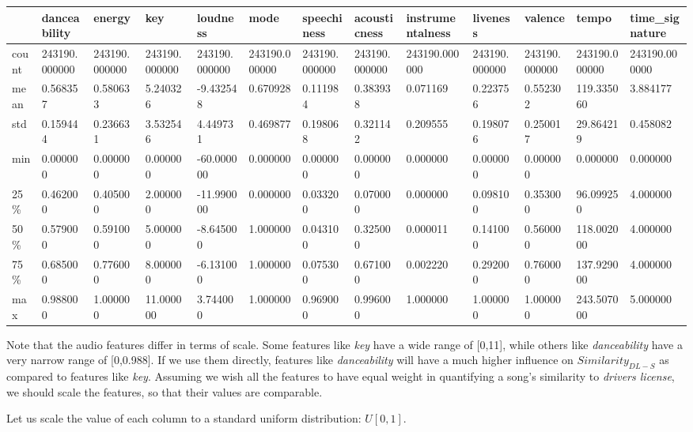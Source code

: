 \documentclass[
  letterpaper,
  DIV=11,
  numbers=noendperiod]{scrreprt}
\begin{document}
\begin{longtable}[]{@{}lllllllllllll@{}}
\toprule\noalign{}
& danceability & energy & key & loudness & mode & speechiness &
acousticness & instrumentalness & liveness & valence & tempo &
time\_signature \\
\midrule\noalign{}
\endhead
\bottomrule\noalign{}
\endlastfoot
count & 243190.000000 & 243190.000000 & 243190.000000 & 243190.000000 &
243190.000000 & 243190.000000 & 243190.000000 & 243190.000000 &
243190.000000 & 243190.000000 & 243190.000000 & 243190.000000 \\
mean & 0.568357 & 0.580633 & 5.240326 & -9.432548 & 0.670928 & 0.111984
& 0.383938 & 0.071169 & 0.223756 & 0.552302 & 119.335060 & 3.884177 \\
std & 0.159444 & 0.236631 & 3.532546 & 4.449731 & 0.469877 & 0.198068 &
0.321142 & 0.209555 & 0.198076 & 0.250017 & 29.864219 & 0.458082 \\
min & 0.000000 & 0.000000 & 0.000000 & -60.000000 & 0.000000 & 0.000000
& 0.000000 & 0.000000 & 0.000000 & 0.000000 & 0.000000 & 0.000000 \\
25\% & 0.462000 & 0.405000 & 2.000000 & -11.990000 & 0.000000 & 0.033200
& 0.070000 & 0.000000 & 0.098100 & 0.353000 & 96.099250 & 4.000000 \\
50\% & 0.579000 & 0.591000 & 5.000000 & -8.645000 & 1.000000 & 0.043100
& 0.325000 & 0.000011 & 0.141000 & 0.560000 & 118.002000 & 4.000000 \\
75\% & 0.685000 & 0.776000 & 8.000000 & -6.131000 & 1.000000 & 0.075300
& 0.671000 & 0.002220 & 0.292000 & 0.760000 & 137.929000 & 4.000000 \\
max & 0.988000 & 1.000000 & 11.000000 & 3.744000 & 1.000000 & 0.969000 &
0.996000 & 1.000000 & 1.000000 & 1.000000 & 243.507000 & 5.000000 \\
\end{longtable}

Note that the audio features differ in terms of scale. Some features
like \emph{key} have a wide range of {[}0,11{]}, while others like
\emph{danceability} have a very narrow range of {[}0,0.988{]}. If we use
them directly, features like \emph{danceability} will have a much higher
influence on \(Similarity_{DL-S}\) as compared to features like
\emph{key}. Assuming we wish all the features to have equal weight in
quantifying a song's similarity to \emph{drivers license}, we should
scale the features, so that their values are comparable.

Let us scale the value of each column to a standard uniform
distribution: \(U[0,1]\).
\end{document}
